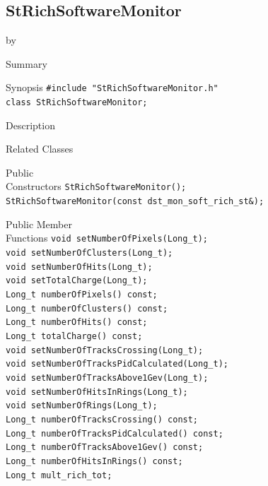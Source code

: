 \documentclass[twoside]{article}
\newcommand{\entrylabel}[1]{\mbox{\textbf{{#1}}}\hfil}%
\newenvironment{entry}
{\begin{list}{}%
    {\renewcommand{\makelabel}{\entrylabel}%
     \setlength{\labelwidth}{90pt}%
     \setlength{\leftmargin}{\labelwidth}
     \advance\leftmargin by \labelsep%
      }%
    }%
  {\end{list}}
\newcommand{\Entrylabel}[1]%
{\raisebox{0pt}[1ex][0pt]{\makebox[\labelwidth][l]%
    {\parbox[t]{\labelwidth}{\hspace{0pt}\textbf{{#1}}}}}}
\newenvironment{Entry}%
{\renewcommand{\entrylabel}{\Entrylabel}\begin{entry}}%
  {\end{entry}}
\begin{document}
\subsection{StRichSoftwareMonitor}
\label{sec:StRichSoftwareMonitor}
\begin{Entry}
\item[Summary]
\item[Synopsis]
    \verb+#include "StRichSoftwareMonitor.h"+\\
    \verb+class StRichSoftwareMonitor;+\\
\item[Description]
\item[Related Classes]
\item[Public\\ Constructors]
    \verb+StRichSoftwareMonitor();+\\
    \verb+StRichSoftwareMonitor(const dst_mon_soft_rich_st&);+\\
\item[Public Member\\ Functions]
    \verb+void setNumberOfPixels(Long_t);+\\
    \verb+void setNumberOfClusters(Long_t);+\\
    \verb+void setNumberOfHits(Long_t);+\\
    \verb+void setTotalCharge(Long_t);+\\
    \verb+Long_t numberOfPixels() const;+\\
    \verb+Long_t numberOfClusters() const;+\\
    \verb+Long_t numberOfHits() const;+\\
    \verb+Long_t totalCharge() const;+\\
    \verb+void setNumberOfTracksCrossing(Long_t);+\\
    \verb+void setNumberOfTracksPidCalculated(Long_t);+\\
    \verb+void setNumberOfTracksAbove1Gev(Long_t);+\\
    \verb+void setNumberOfHitsInRings(Long_t);+\\
    \verb+void setNumberOfRings(Long_t);+\\
    \verb+Long_t numberOfTracksCrossing() const;+\\
    \verb+Long_t numberOfTracksPidCalculated() const;+\\
    \verb+Long_t numberOfTracksAbove1Gev() const;+\\
    \verb+Long_t numberOfHitsInRings() const;+\\
    \verb+Long_t mult_rich_tot;+\\
\end{Entry}
\end{document}
